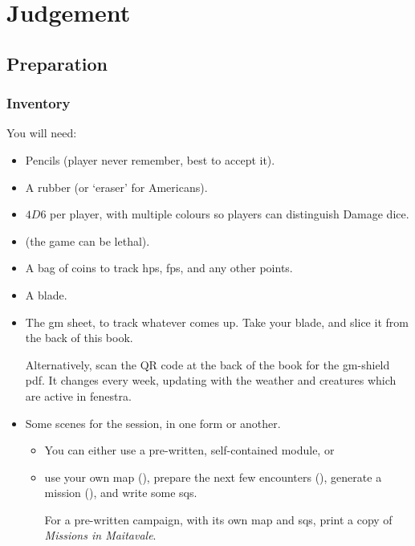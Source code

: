 \chapter[Bastion of Judgement]{Judgement}
\label{judgement}

\section{Preparation}

\begin{multicols}{2}

\subsection{Inventory}

You will need:

\begin{itemize}
  \item
  Pencils (player never remember, best to accept it).
  \item
  A rubber (or `eraser' for Americans).
  \item
  $4D6$ per player, with multiple colours so players can distinguish Damage dice.
  \item
  \iftoggle{stories}{
    A boat-load of character sheets
  }{
    Some pre-made characters, including spares
  } (the game can be lethal).
  \item
  A bag of coins to track \glspl{hp}, \glspl{fp}, and any other points.
  \item
  A blade.
  \item
  The \gls{gm} sheet, to track whatever comes up.
  Take your blade, and slice it from the back of this book.

  Alternatively, scan the QR code at the back of the book for the \gls{gm}-shield \gls{pdf}.
  It changes every week, updating with the weather and creatures which are active in \gls{fenestra}.
  \item
  Some scenes for the session, in one form or another.
  \begin{itemize}
    \item
    You can either use a pre-written, self-contained module, or
    \item
    use your own map (),
    prepare the next few encounters (),
    generate a mission (),
    and write some \glspl{sq}.

    For a pre-written \gls{campaign}, with its own map and \glspl{sq}, print a copy of \textit{Missions in Maitavale}.
  \end{itemize}
\end{itemize}


\end{multicols}
